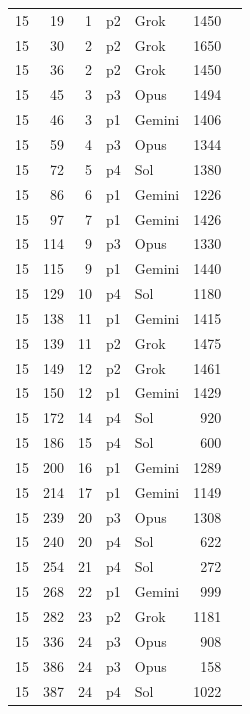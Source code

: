 \begin{longtable}{r r r l l r L{2.2in}}
15 & 19 & 1 & p2 & Grok & 1450 &  \\
15 & 30 & 2 & p2 & Grok & 1650 &  \\
15 & 36 & 2 & p2 & Grok & 1450 &  \\
15 & 45 & 3 & p3 & Opus & 1494 &  \\
15 & 46 & 3 & p1 & Gemini & 1406 &  \\
15 & 59 & 4 & p3 & Opus & 1344 &  \\
15 & 72 & 5 & p4 & Sol & 1380 &  \\
15 & 86 & 6 & p1 & Gemini & 1226 &  \\
15 & 97 & 7 & p1 & Gemini & 1426 &  \\
15 & 114 & 9 & p3 & Opus & 1330 &  \\
15 & 115 & 9 & p1 & Gemini & 1440 &  \\
15 & 129 & 10 & p4 & Sol & 1180 &  \\
15 & 138 & 11 & p1 & Gemini & 1415 &  \\
15 & 139 & 11 & p2 & Grok & 1475 &  \\
15 & 149 & 12 & p2 & Grok & 1461 &  \\
15 & 150 & 12 & p1 & Gemini & 1429 &  \\
15 & 172 & 14 & p4 & Sol & 920 &  \\
15 & 186 & 15 & p4 & Sol & 600 &  \\
15 & 200 & 16 & p1 & Gemini & 1289 &  \\
15 & 214 & 17 & p1 & Gemini & 1149 &  \\
15 & 239 & 20 & p3 & Opus & 1308 &  \\
15 & 240 & 20 & p4 & Sol & 622 &  \\
15 & 254 & 21 & p4 & Sol & 272 &  \\
15 & 268 & 22 & p1 & Gemini & 999 &  \\
15 & 282 & 23 & p2 & Grok & 1181 &  \\
15 & 336 & 24 & p3 & Opus & 908 &  \\
15 & 386 & 24 & p3 & Opus & 158 &  \\
15 & 387 & 24 & p4 & Sol & 1022 &  \\

\end{longtable}
